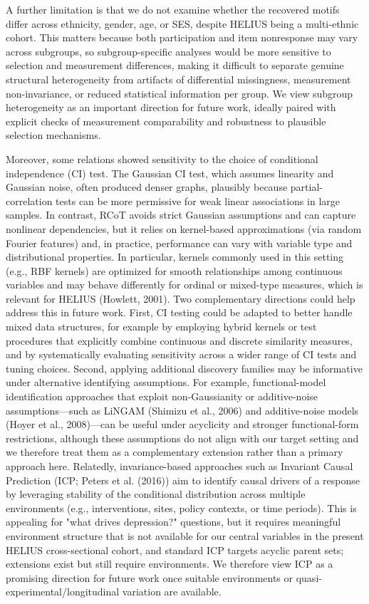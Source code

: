 \documentclass[
]{article}
\begin{document}
\textcolor{BrickRed}{A further limitation is that we do not examine whether the recovered motifs differ across ethnicity, gender, age, or SES, despite HELIUS being a multi-ethnic cohort. This matters because both participation and item nonresponse may vary across subgroups, so subgroup-specific analyses would be more sensitive to selection and measurement differences, making it difficult to separate genuine structural heterogeneity from artifacts of differential missingness, measurement non-invariance, or reduced statistical information per group. We view subgroup heterogeneity as an important direction for future work, ideally paired with explicit checks of measurement comparability and robustness to plausible selection mechanisms.}

Moreover, some relations showed sensitivity to the choice of conditional
independence (CI) test. The Gaussian CI test, which assumes linearity
and Gaussian noise, often produced denser graphs, plausibly because
partial-correlation tests can be more permissive for weak linear
associations in large samples. In contrast, RCoT avoids strict Gaussian
assumptions and can capture nonlinear dependencies, but it relies on
kernel-based approximations (via random Fourier features) and, in
practice, performance can vary with variable type and distributional
properties. In particular, kernels commonly used in this setting (e.g.,
RBF kernels) are optimized for smooth relationships among continuous
variables and may behave differently for ordinal or mixed-type measures,
which is relevant for HELIUS (Howlett, 2001).
\textcolor{BrickRed}{Two complementary directions could help address this in future work. First, CI testing could be adapted to better handle mixed data structures, for example by employing hybrid kernels or test procedures that explicitly combine continuous and discrete similarity measures, and by systematically evaluating sensitivity across a wider range of CI tests and tuning choices. Second, applying additional discovery families may be informative under alternative identifying assumptions. 
For example, functional-model identification approaches that exploit non-Gaussianity or additive-noise assumptions—such as LiNGAM}
(Shimizu et al., 2006) \textcolor{BrickRed}{and additive-noise models}
(Hoyer et al.,
2008)\textcolor{BrickRed}{—can be useful under acyclicity and stronger functional-form restrictions, although these assumptions do not align with our target setting and we therefore treat them as a complementary extension rather than a primary approach here. Relatedly, invariance-based approaches such as Invariant Causal Prediction (ICP;}
Peters et al.
(2016)\textcolor{BrickRed}{) aim to identify causal drivers of a response by leveraging stability of the conditional distribution across multiple environments (e.g., interventions, sites, policy contexts, or time periods). This is appealing for "what drives depression?" questions, but it requires meaningful environment structure that is not available for our central variables in the present HELIUS cross-sectional cohort, and standard ICP targets acyclic parent sets; extensions exist but still require environments. We therefore view ICP as a promising direction for future work once suitable environments or quasi-experimental/longitudinal variation are available.}
\end{document}
